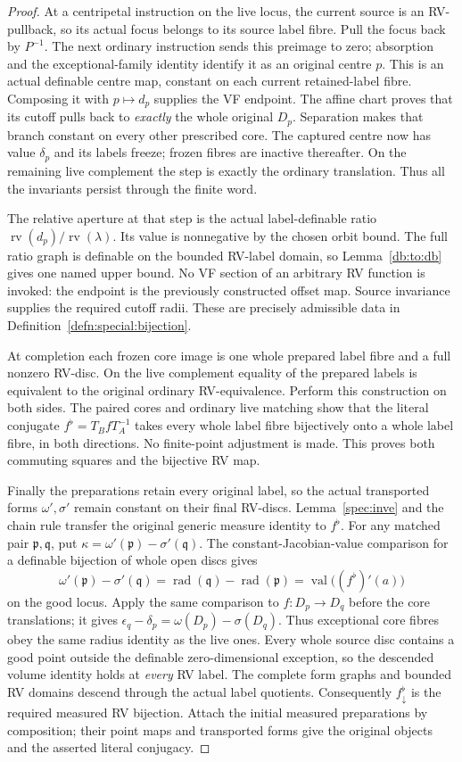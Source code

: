 \documentclass[12pt]{amsart}
\theoremstyle{plain}
\theoremstyle{definition}
\theoremstyle{remark}
\numberwithin{equation}{section}
\theoremstyle{plain}
\newcommand{\gp}{\mathfrak{p}}
\newcommand{\gq}{\mathfrak{q}}
\newcommand{\0}{\emptyset}
\DeclareMathOperator{\rv}{rv}
\DeclareMathOperator{\vv}{val}
\DeclareMathOperator{\rad}{rad}
\begin{document}
\begin{proof}
At a centripetal instruction on the live locus, the current source
is an RV-pullback, so its actual focus belongs to its source label
fibre. Pull the focus back by $P^{-1}$. The next ordinary instruction
sends this preimage to zero; absorption and the exceptional-family
identity identify it as an original centre $p$. This is an actual
definable centre map, constant on each current retained-label fibre.
Composing it with $p\mapsto d_p$ supplies the VF endpoint. The affine
chart proves that its cutoff pulls back to \emph{exactly} the whole
original $D_p$. Separation makes that branch constant on every other
prescribed core. The captured centre now has value $\delta_p$ and
its labels freeze; frozen fibres are inactive thereafter. On the
remaining live complement the step is exactly the ordinary translation.
Thus all the invariants persist through the finite word.

The relative aperture at that step is the actual label-definable
ratio $\rv(d_p)/\rv(\lambda)$. Its value is nonnegative by the
chosen orbit bound. The full ratio graph is definable on the bounded
RV-label domain, so Lemma~\ref{db:to:db} gives one named upper bound.
No VF section of an arbitrary RV function is invoked: the endpoint
is the previously constructed offset map. Source invariance supplies
the required cutoff radii. These are precisely admissible data in
Definition~\ref{defn:special:bijection}.

At completion each frozen core image is one whole prepared label
fibre and a full nonzero RV-disc. On the live complement equality
of the prepared labels is equivalent to the original ordinary
RV-equivalence. Perform this construction on both sides. The paired
cores and ordinary live matching show that the literal conjugate
$f^\flat=T_BfT_A^{-1}$ takes every whole label fibre bijectively onto
a whole label fibre, in both directions. No finite-point adjustment
is made. This proves both commuting squares and the bijective RV map.

Finally the preparations retain every original label, so the actual
transported forms $\omega',\sigma'$ remain constant on their final
RV-discs. Lemma~\ref{spec:inve} and the chain rule transfer the
original generic measure identity to $f^\flat$. For any matched
pair $\gp,\gq$, put $\kappa=\omega'(\gp)-\sigma'(\gq)$.
The constant-Jacobian-value comparison for a definable bijection of
whole open discs gives
\[
 \omega'(\gp)-\sigma'(\gq)
 =\rad(\gq)-\rad(\gp)
 =\vv\bigl((f^\flat)'(a)\bigr)
\]
on the good locus. Apply the same comparison to $f:D_p\to D_q$
before the core translations; it gives
$\epsilon_q-\delta_p=\omega(D_p)-\sigma(D_q)$.
Thus exceptional core fibres obey the same radius identity as the
live ones. Every whole source disc contains a good point outside
the definable zero-dimensional exception, so the descended volume
identity holds at \emph{every} RV label. The complete form graphs
and bounded RV domains descend through the actual label quotients.
Consequently $f^\flat_\downarrow$ is the required measured RV
bijection. Attach the initial measured preparations by composition;
their point maps and transported forms give the original objects
and the asserted literal conjugacy.
\end{proof}
\end{document}
